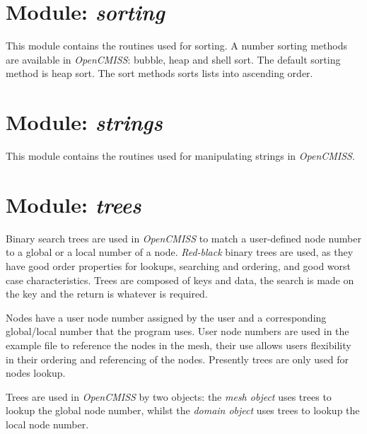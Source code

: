 \section{Module: \emph{sorting}}
\label{sec:sorting}

This module contains the routines used for sorting. A number sorting methods 
are available in \emph{OpenCMISS}: bubble, heap and shell sort. The default 
sorting method is heap sort. The sort methods sorts lists into ascending order. 


\section{Module: \emph{strings}}
\label{sec:strings}

This module contains the routines used for manipulating strings in 
\emph{OpenCMISS}.


\section{Module: \emph{trees}}
\label{sec:trees}

Binary search trees are used in \emph{OpenCMISS} to match a user-defined node 
number to a global or a local number of a node. \emph{Red-black} binary trees 
are used, as they have good order properties for lookups, searching and ordering, 
and good worst case characteristics. Trees are composed of keys and data, the 
search is made on the key and the return is whatever is required.

Nodes have a user node number assigned by the user and a corresponding 
global/local number that the program uses. User node numbers are used in the 
example file to reference the nodes in the mesh, their use allows users flexibility 
in their ordering and referencing of the nodes. Presently trees are only used for 
nodes lookup.

Trees are used in \emph{OpenCMISS} by two objects: the \emph{mesh object} uses 
trees to lookup the global node number, whilst the \emph{domain object} uses trees 
to lookup the local node number.
